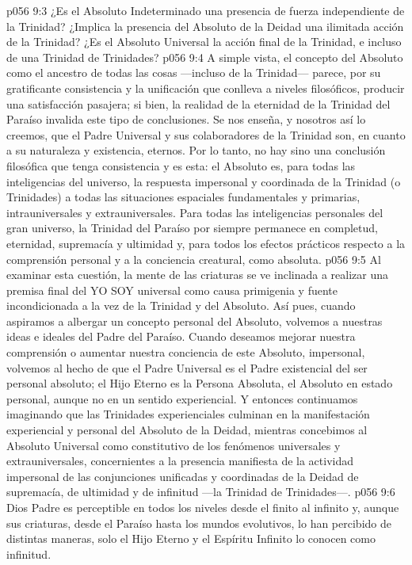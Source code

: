 \vs p056 9:3 ¿Es el Absoluto Indeterminado una presencia de fuerza independiente de la Trinidad? ¿Implica la presencia del Absoluto de la Deidad una ilimitada acción de la Trinidad? ¿Es el Absoluto Universal la acción final de la Trinidad, e incluso de una Trinidad de Trinidades?
\vs p056 9:4 A simple vista, el concepto del Absoluto como el ancestro de todas las cosas ---incluso de la Trinidad--- parece, por su gratificante consistencia y la unificación que conlleva a niveles filosóficos, producir una satisfacción pasajera; si bien, la realidad de la eternidad de la Trinidad del Paraíso invalida este tipo de conclusiones. Se nos enseña, y nosotros así lo creemos, que el Padre Universal y sus colaboradores de la Trinidad son, en cuanto a su naturaleza y existencia, eternos. Por lo tanto, no hay sino una conclusión filosófica que tenga consistencia y es esta: el Absoluto es, para todas las inteligencias del universo, la respuesta impersonal y coordinada de la Trinidad (o Trinidades) a todas las situaciones espaciales fundamentales y primarias, intrauniversales y extrauniversales. Para todas las inteligencias personales del gran universo, la Trinidad del Paraíso por siempre permanece en completud, eternidad, supremacía y ultimidad y, para todos los efectos prácticos respecto a la comprensión personal y a la conciencia creatural, como absoluta.
\vs p056 9:5 Al examinar esta cuestión, la mente de las criaturas se ve inclinada a realizar una premisa final del YO SOY universal como causa primigenia y fuente incondicionada a la vez de la Trinidad y del Absoluto. Así pues, cuando aspiramos a albergar un concepto personal del Absoluto, volvemos a nuestras ideas e ideales del Padre del Paraíso. Cuando deseamos mejorar nuestra comprensión o aumentar nuestra conciencia de este Absoluto, impersonal, volvemos al hecho de que el Padre Universal es el Padre existencial del ser personal absoluto; el Hijo Eterno es la Persona Absoluta, el Absoluto en estado personal, aunque no en un sentido experiencial. Y entonces continuamos imaginando que las Trinidades experienciales culminan en la manifestación experiencial y personal del Absoluto de la Deidad, mientras concebimos al Absoluto Universal como constitutivo de los fenómenos universales y extrauniversales, concernientes a la presencia manifiesta de la actividad impersonal de las conjunciones unificadas y coordinadas de la Deidad de supremacía, de ultimidad y de infinitud ---la Trinidad de Trinidades---.
\vs p056 9:6 \pc Dios Padre es perceptible en todos los niveles desde el finito al infinito y, aunque sus criaturas, desde el Paraíso hasta los mundos evolutivos, lo han percibido de distintas maneras, solo el Hijo Eterno y el Espíritu Infinito lo conocen como infinitud.
